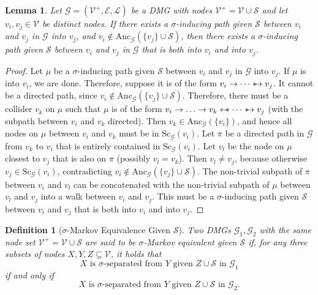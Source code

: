 \documentclass[accepted]{uai2025} %
\newtheorem{definition}{Definition}
\newtheorem{lemma}{Lemma}
\newcommand{\anc}{\text{Anc}}
\newcommand{\tuh}{\mathrel{\rightarrow}}
\newcommand{\hus}{\mathrel{{\leftarrow\mkern-11mu\ast}}}
\newcommand{\suh}{\mathrel{{\ast\mkern-11mu\to}}}
\begin{document}
\begin{lemma}\label{lemma12.2.6}
Let ${\mathcal{G}}=(\mathcal{V}^+,\mathcal{E},\mathcal{L})$ be a DMG with nodes $\mathcal{V}^+=\mathcal{V}\cup{\mathcal{S}}$ and let $v_i,v_j\in\mathcal{V}$ be distinct nodes. If there exists a $\sigma$-inducing path given ${\mathcal{S}}$ between $v_i$ and $v_j$ in ${\mathcal{G}}$ into $v_j$, and $v_i\notin \anc_{\mathcal{G}}(\{v_j\}\cup{\mathcal{S}})$, then there exists a $\sigma$-inducing path given ${\mathcal{S}}$ between $v_i$ and $v_j$ in ${\mathcal{G}}$ that is both into $v_i$ and into $v_j$.
\end{lemma}
\begin{proof}
Let $\mu$ be a $\sigma$-inducing path given $\mathcal{S}$ between $v_i$ and $v_j$ in $\mathcal{G}$ into $v_j$.
  If $\mu$ is into $v_i$, we are done.
  Therefore, suppose it is of the form $v_i \tuh \cdots \suh v_j$. 
  It cannot be a directed path, since $v_i \notin \anc_\mathcal{G}(\{v_j\} \cup \mathcal{S})$.
  Therefore, there must be a collider $v_k$ on $\mu$ such that $\mu$ is of the form $v_i \tuh \dots \tuh v_k \hus \cdots \suh v_j$
  (with the subpath between $v_i$ and $v_k$ directed).
  Then $v_k \in \anc_\mathcal{G}(\{v_i\})$, and hence all nodes on $\mu$ between $v_i$ and $v_k$ must be in $\text{Sc}_\mathcal{G}(v_i)$.
  Let $\pi$ be a directed path in $\mathcal{G}$ from $v_k$ to $v_i$ that is entirely contained in $\text{Sc}_\mathcal{G}(v_i)$.
  Let $v_l$ be the node on $\mu$ closest to $v_j$ that is also on $\pi$ (possibly $v_l = v_k$).
  Then $v_l \ne v_j$, because otherwise $v_j \in \text{Sc}_\mathcal{G}(v_i)$, contradicting $v_i \notin \anc_\mathcal{G}(\{v_j\} \cup \mathcal{S})$.
  The non-trivial subpath of $\pi$ between $v_i$ and $v_l$ can be concatenated with the non-trivial subpath of $\mu$ between $v_l$ and $v_j$ into a walk between $v_i$ and $v_j$.
  This must be a $\sigma$-inducing path given $\mathcal{S}$ between $v_i$ and $v_j$ that is both into $v_i$ and into $v_j$.
\end{proof}



\begin{definition}[$\sigma$-Markov Equivalence Given $\mathcal{S}$] \label{sigmamarkov}
Two DMGs \( \mathcal{G}_1, \mathcal{G}_2 \) with the same node set \( \mathcal{V}^+ = \mathcal{V} \cup \mathcal{S} \) are said to be \emph{\(\sigma\)-Markov equivalent given \( \mathcal{S} \)} if, for any three subsets of nodes \( X, Y, Z \subseteq \mathcal{V} \), it holds that  
\[
X \text{ is } \sigma\text{-separated from } Y \text{ given } Z \cup \mathcal{S} \text{ in } \mathcal{G}_1
\]
if and only if  
\[
X \text{ is } \sigma\text{-separated from } Y \text{ given } Z \cup \mathcal{S} \text{ in } \mathcal{G}_2.
\]
\end{definition}
\end{document}
